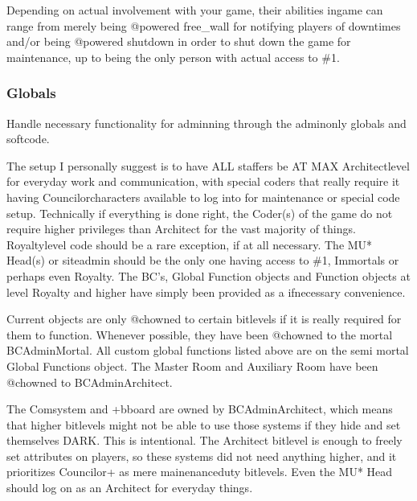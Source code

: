\documentclass[letterpaper,10pt,english]{sphinxmanual}
\begin{document}
\sphinxAtStartPar
Depending on actual involvement with your game, their abilities
in\sphinxhyphen{}game can range from merely being @powered free\_wall for
notifying players of downtimes and/or being @powered shutdown in
order to shut down the game for maintenance, up to being the
only person with actual access to \#1.


\subsubsection{Globals}
\label{\detokenize{gettingstarted:globals}}
\sphinxAtStartPar
Handle necessary functionality for adminning through the admin\sphinxhyphen{}only globals and
softcode.

\sphinxAtStartPar
The setup I personally suggest is to have ALL staffers be AT MAX Architect\sphinxhyphen{}level
for everyday work and communication, with special coders that \sphinxhyphen{}really\sphinxhyphen{} require
it having Councilor\sphinxhyphen{}characters available to log into for maintenance or special
code setup. Technically if everything is done right, the Coder(s) of the game do
not require higher privileges than Architect for the vast majority of things.
Royalty\sphinxhyphen{}level code should be a rare exception, if at all necessary. The MU*
Head(s) or site\sphinxhyphen{}admin should be the only one having access to \#1, Immortals or
perhaps even Royalty. The BC’s, Global Function objects and Function objects at
level Royalty and higher have simply been provided as a if\sphinxhyphen{}necessary convenience.

\sphinxAtStartPar
Current objects are only @chowned to certain bitlevels if it is really required
for them to function. Whenever possible, they have been @chowned to the mortal
BC\sphinxhyphen{}Admin\sphinxhyphen{}Mortal. All custom global functions listed above are on the semi\sphinxhyphen{}
\sphinxhyphen{}mortal Global Functions object. The Master Room and Auxiliary Room have been
@chowned to BC\sphinxhyphen{}Admin\sphinxhyphen{}Architect.

\sphinxAtStartPar
The Comsystem and +bboard are owned by BC\sphinxhyphen{}Admin\sphinxhyphen{}Architect, which means that
higher bitlevels might not be able to use those systems if they hide and set
themselves DARK. This is intentional. The Architect bitlevel is enough to freely
set attributes on players, so these systems did not need anything higher, and
it prioritizes Councilor+ as mere mainenance\sphinxhyphen{}duty bitlevels. Even the MU* Head
should log on as an Architect for everyday things.
\end{document}
